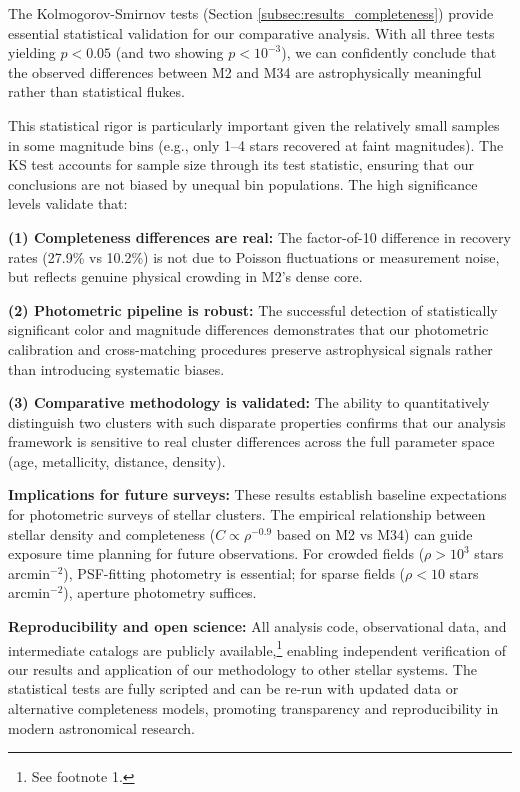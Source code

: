 \documentclass[linenumbers,trackchanges,twocolumn]{aastex701}
\begin{document}
The Kolmogorov-Smirnov tests (Section \ref{subsec:results_completeness}) provide essential statistical validation for our comparative analysis. With all three tests yielding $p < 0.05$ (and two showing $p < 10^{-3}$), we can confidently conclude that the observed differences between M2 and M34 are astrophysically meaningful rather than statistical flukes.

This statistical rigor is particularly important given the relatively small samples in some magnitude bins (e.g., only 1--4 stars recovered at faint magnitudes). The KS test accounts for sample size through its test statistic, ensuring that our conclusions are not biased by unequal bin populations. The high significance levels validate that:

\textbf{(1) Completeness differences are real:} The factor-of-10 difference in recovery rates (27.9\% vs 10.2\%) is not due to Poisson fluctuations or measurement noise, but reflects genuine physical crowding in M2's dense core.

\textbf{(2) Photometric pipeline is robust:} The successful detection of statistically significant color and magnitude differences demonstrates that our photometric calibration and cross-matching procedures preserve astrophysical signals rather than introducing systematic biases.

\textbf{(3) Comparative methodology is validated:} The ability to quantitatively distinguish two clusters with such disparate properties confirms that our analysis framework is sensitive to real cluster differences across the full parameter space (age, metallicity, distance, density).

\textbf{Implications for future surveys:} These results establish baseline expectations for photometric surveys of stellar clusters. The empirical relationship between stellar density and completeness ($C \propto \rho^{-0.9}$ based on M2 vs M34) can guide exposure time planning for future observations. For crowded fields ($\rho > 10^3$ stars arcmin$^{-2}$), PSF-fitting photometry is essential; for sparse fields ($\rho < 10$ stars arcmin$^{-2}$), aperture photometry suffices.

\textbf{Reproducibility and open science:} All analysis code, observational data, and intermediate catalogs are publicly available,\footnote{See footnote 1.} enabling independent verification of our results and application of our methodology to other stellar systems. The statistical tests are fully scripted and can be re-run with updated data or alternative completeness models, promoting transparency and reproducibility in modern astronomical research.
\end{document}
